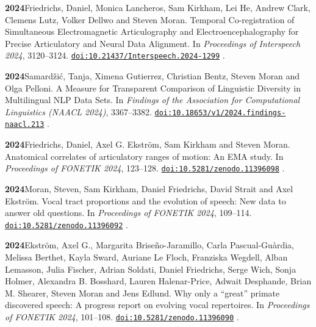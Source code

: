 \documentclass[11pt]{article}
\newcommand{\hangpara}{
 \setlength{\parindent}{0in} %
 \hangindent=0.42in %
}
\newcommand{\doi}[1]{%
  \href{https://doi.org/#1}{\nolinkurl{doi:#1}}%
}
\begin{document}
\vskip 6pt
\hangpara
{\bf 2024}\hspace{1ex}Friedrichs, Daniel, Monica Lancheros, Sam Kirkham, Lei He, Andrew Clark, Clemens Lutz, Volker Dellwo and Steven Moran. Temporal Co-registration of Simultaneous Electromagnetic Articulography and Electroencephalography for Precise Articulatory and Neural Data Alignment. In {\it Proceedings of Interspeech 2024}, 3120--3124. \doi{10.21437/Interspeech.2024-1299}.

\vskip 6pt
\hangpara
{\bf 2024}\hspace{1ex}Samardžić, Tanja, Ximena Gutierrez, Christian Bentz, Steven Moran and Olga Pelloni. A Measure for Transparent Comparison of Linguistic Diversity in Multilingual NLP Data Sets. In {\it Findings of the Association for Computational Linguistics (NAACL 2024)}, 3367--3382. \doi{10.18653/v1/2024.findings-naacl.213}.

\vskip 6pt
\hangpara
{\bf 2024}\hspace{1ex}Friedrichs, Daniel, Axel G. Ekström, Sam Kirkham and Steven Moran. Anatomical correlates of articulatory ranges of motion: An EMA study. In {\it Proceedings of FONETIK 2024}, 123--128. \doi{10.5281/zenodo.11396098}.

\vskip 6pt
\hangpara
{\bf 2024}\hspace{1ex}Moran, Steven, Sam Kirkham, Daniel Friedrichs, David Strait and Axel Ekström. Vocal tract proportions and the evolution of speech: New data to answer old questions. In {\it Proceedings of FONETIK 2024}, 109--114. \doi{10.5281/zenodo.11396092}.

\vskip 6pt
\hangpara
{\bf 2024}\hspace{1ex}Ekström, Axel G., Margarita Briseño-Jaramillo, Carla Pascual-Guàrdia, Melissa Berthet, Kayla Sward, Auriane Le Floch, Franziska Wegdell, Alban Lemasson, Julia Fischer, Adrian Soldati, Daniel Friedrichs, Serge Wich, Sonja Holmer, Alexandra B. Bosshard, Lauren Halenar-Price, Adwait Desphande, Brian M. Shearer, Steven Moran and Jens Edlund. Why only a ``great'' primate discovered speech: A progress report on evolving vocal repertoires. In {\it Proceedings of FONETIK 2024}, 101--108. \doi{10.5281/zenodo.11396090}.
\end{document}
